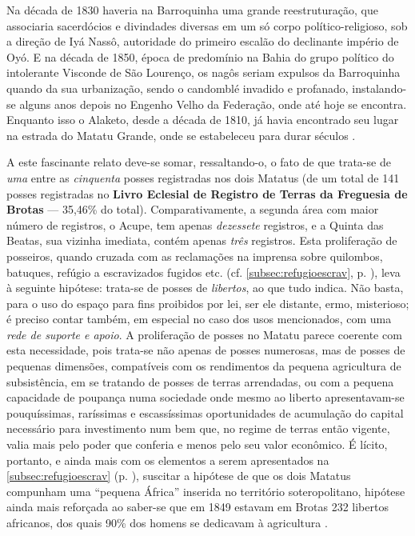 \begin{citacao}
Na década de 1830 haveria na Barroquinha uma grande reestruturação, que associaria sacerdócios e divindades diversas em um só corpo político-religioso, sob a direção de Iyá Nassô, autoridade do primeiro escalão do declinante império de Oyó. E na década de 1850, época de predomínio na Bahia do grupo político do intolerante Visconde de São Lourenço, os nagôs seriam expulsos da Barroquinha quando da sua urbanização, sendo o candomblé invadido e profanado, instalando-se alguns anos depois no Engenho Velho da Federação, onde até hoje se encontra. Enquanto isso o Alaketo, desde a década de 1810, já havia encontrado seu lugar na estrada do Matatu Grande, onde se estabeleceu para durar séculos \cite[p.~354-356, 369-377]{silveira_alaketo_2003}.
\end{citacao}

A este fascinante relato deve-se somar, ressaltando-o, o fato de que trata-se de \textit{uma} entre as \textit{cinquenta} posses registradas nos dois Matatus (de um total de 141 posses registradas no \textbf{Livro Eclesial de Registro de Terras da Freguesia de Brotas} --- 35,46\% do total). Comparativamente, a segunda área com maior número de registros, o Acupe, tem apenas \textit{dezessete} registros, e a Quinta das Beatas, sua vizinha imediata, contém apenas \textit{três} registros. Esta proliferação de posseiros, quando cruzada com as reclamações na imprensa sobre quilombos, batuques, refúgio a escravizados fugidos etc. (cf. \autoref{subsec:refugioescrav}, p. \pageref{subsec:refugioescrav}), leva à seguinte hipótese: trata-se de posses de \textit{libertos}, ao que tudo indica. Não basta, para o uso do espaço para fins proibidos por lei, ser ele distante, ermo, misterioso; é preciso contar também, em especial no caso dos usos mencionados, com uma \textit{rede de suporte e apoio}. A proliferação de posses no Matatu parece coerente com esta necessidade, pois trata-se não apenas de posses numerosas, mas de posses de pequenas dimensões, compatíveis com os rendimentos da pequena agricultura de subsistência, em se tratando de posses de terras arrendadas, ou com a pequena capacidade de poupança numa sociedade onde mesmo ao liberto apresentavam-se pouquíssimas, raríssimas e escassíssimas oportunidades de acumulação do capital necessário para investimento num bem que, no regime de terras então vigente, valia mais pelo poder que conferia e menos pelo seu valor econômico. É lícito, portanto, e ainda mais com os elementos a serem apresentados na \autoref{subsec:refugioescrav} (p. \pageref{subsec:refugioescrav}), suscitar a hipótese de que os dois Matatus compunham uma ``pequena África'' inserida no território soteropolitano, hipótese ainda mais reforçada ao saber-se que em 1849 estavam em Brotas 232 libertos africanos, dos quais 90\% dos homens se dedicavam à agricultura \cite[p.~151]{COSTA1989}.

